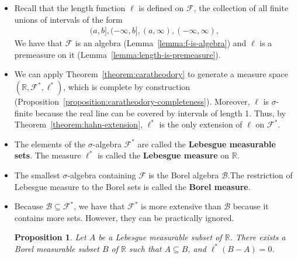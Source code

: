 \documentclass[10pt]{article}
\newtheorem{proposition}[lemma]{Proposition}
\newcommand{\mcal}[1]{\mathcal{#1}}
\newcommand{\Real}{\mathbb{R}}
\begin{document}
\begin{itemize}
  \item Recall that the length function $\ell$ is defined on $\mcal{F}$, the collection of all finite unions of intervals of the form
  \begin{align*}
      (a,b], (-\infty,b], (a,\infty), (-\infty,\infty),      
  \end{align*}
  We have that $\mcal{F}$ is an algebra (Lemma~\ref{lemma:f-is-algebra}) and $\ell$ is a premeasure on it (Lemma~\ref{lemma:length-is-premeasure}).

  \item We can apply Theorem~\ref{theorem:caratheodory} to generate a measure space $(\Real, \mcal{F}^*, \ell^*)$, which is complete by construction (Proposition~\ref{proposition:caratheodory-completeness}). Moreover, $\ell$ is $\sigma$-finite because the real line can be covered by intervals of length 1. Thus, by Theorem~\ref{theorem:hahn-extension}, $\ell^*$ is the only extension of $\ell$ on $\mcal{F}^*$.
  
  \item The elements of the $\sigma$-algebra $\mcal{F}^*$ are called the {\bf Lebesgue measurable sets}. The measure $\ell^*$ is called the {\bf Lebesgue measure} on $\Real$.
  
  \item The smallest $\sigma$-algebra containing $\mcal{F}$ is the Borel algebra $\mcal{B}$.The restriction of Lebesgue measure to the Borel sets is called the {\bf Borel measure}. 
  
  \item Because $\mcal{B} \subseteq \mcal{F}^*$, we have that $\mcal{F}^*$ is more extensive than $\mcal{B}$ because it contains more sets. However, they can be practically ignored.

  \begin{proposition}
    Let $A$ be a Lebesgue measurable subset of $\Real$. There exists a Borel measurable subset $B$ of $\Real$ such that $A \subseteq B$, and $\ell^*(B - A) = 0$.
  \end{proposition}


\end{itemize}
\end{document}

